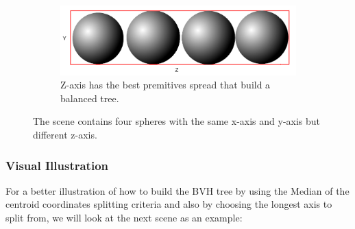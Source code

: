 \documentclass[11pt,a4paper]{article}
\begin{document}
\begin{figure}[H]
\begin{subfigure}[b]{0.3\textwidth}
         \label{fig:pi_5000}
     \end{subfigure}
     \hfill
     \begin{subfigure}[b]{0.3\textwidth}
         \centering
         \includegraphics[width=\textwidth]{images/LONGAXIS_Z.png}
         \caption{Z-axis has the best premitives spread that build a balanced tree.}
         \label{fig:pi_18000}
     \end{subfigure}
        \captionsetup{justification=centering,margin=2cm}
        \caption{The scene contains four spheres with the same x-axis and y-axis but different z-axis. }
        \label{fig:three graphs}
\end{figure}

\subsubsection{Visual Illustration}
For a better illustration of how to build the BVH tree by using the Median of the centroid coordinates splitting criteria and also by choosing the longest axis to split from, we will look at the next scene as an example: 
\end{document}
